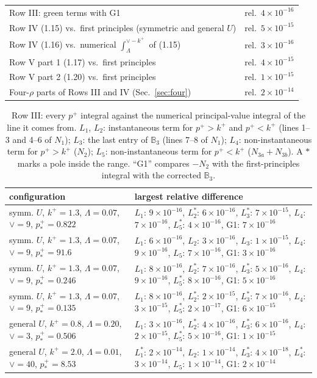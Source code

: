 \documentclass[10pt]{article}
\numberwithin{equation}{section}
\def\mf#1{\mathbb{#1}}
\begin{document}
\begin{longtable}{@{}p{}p{}@{}}
Row III: green terms with G1 & rel.\ $4\times10^{-16}$\\
Row IV (1.15) vs.\ first principles (symmetric and general $U$) & rel.\ $5\times10^{-15}$\\
Row IV (1.16) vs.\ numerical $\int_\Lambda^{\vee-k^+}$ of (1.15) & rel.\ $3\times10^{-16}$\\
Row V part 1 (1.17) vs.\ first principles & rel.\ $4\times10^{-15}$\\
Row V part 2 (1.20) vs.\ first principles & rel.\ $1\times10^{-15}$\\
Four-$\rho$ parts of Rows III and IV (Sec.~\ref{sec:four}) & rel.\ $2\times10^{-14}$\\
\bottomrule
\end{longtable}
\begin{longtable}{@{}p{}p{}@{}}
\caption{Row III: every $p^+$ integral against the numerical principal-value integral of the line it comes from. $L_1$, $L_2$: instantaneous term for $p^+>k^+$ and $p^+<k^+$ (lines 1--3 and 4--6 of $N_1$); $L_3$: the last entry of $\mf B_3$ (lines 7--8 of $N_1$); $L_4$: non-instantaneous term for $p^+>k^+$ ($N_2$); $L_5$: non-instantaneous term for $p^+<k^+$ ($N_{3a}+N_{3b}$). A $\ast$ marks a pole inside the range. ``G1'' compares $-N_2$ with the first-principles integral with the corrected $\mf B_3$.}\label{tab:III}\\\toprule
configuration & largest relative difference\\\midrule
symm. $U$, $k^+=1.3$, $\Lambda=0.07$, $\vee=9$, $p^+_*=0.822$ & $L_1$: $9\times10^{-16}$, $L_2^\ast$: $6\times10^{-16}$, $L_3^\ast$: $7\times10^{-15}$, $L_4$: $7\times10^{-16}$, $L_5^\ast$: $4\times10^{-16}$, G1: $7\times10^{-16}$\\
symm. $U$, $k^+=1.3$, $\Lambda=0.07$, $\vee=9$, $p^+_*=91.6$ & $L_1$: $6\times10^{-16}$, $L_2$: $3\times10^{-16}$, $L_3$: $1\times10^{-15}$, $L_4$: $9\times10^{-16}$, $L_5$: $7\times10^{-16}$, G1: $3\times10^{-16}$\\
symm. $U$, $k^+=1.3$, $\Lambda=0.07$, $\vee=9$, $p^+_*=0.246$ & $L_1$: $8\times10^{-16}$, $L_2^\ast$: $7\times10^{-16}$, $L_3^\ast$: $5\times10^{-16}$, $L_4$: $9\times10^{-16}$, $L_5^\ast$: $8\times10^{-16}$, G1: $5\times10^{-16}$\\
symm. $U$, $k^+=1.3$, $\Lambda=0.07$, $\vee=9$, $p^+_*=0.135$ & $L_1$: $8\times10^{-16}$, $L_2^\ast$: $2\times10^{-15}$, $L_3^\ast$: $7\times10^{-16}$, $L_4$: $3\times10^{-15}$, $L_5^\ast$: $2\times10^{-17}$, G1: $6\times10^{-15}$\\
general $U$, $k^+=0.8$, $\Lambda=0.20$, $\vee=3$, $p^+_*=0.506$ & $L_1$: $3\times10^{-16}$, $L_2^\ast$: $4\times10^{-16}$, $L_3^\ast$: $6\times10^{-16}$, $L_4$: $2\times10^{-15}$, $L_5^\ast$: $5\times10^{-16}$, G1: $1\times10^{-15}$\\
general $U$, $k^+=2.0$, $\Lambda=0.01$, $\vee=40$, $p^+_*=8.53$ & $L_1^\ast$: $2\times10^{-14}$, $L_2$: $1\times10^{-14}$, $L_3^\ast$: $4\times10^{-18}$, $L_4^\ast$: $3\times10^{-14}$, $L_5$: $1\times10^{-14}$, G1: $2\times10^{-14}$\\
\bottomrule
\end{longtable}
\end{document}
